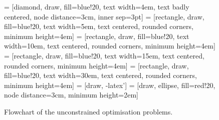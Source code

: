 \begin{figure}

 =   [diamond,   draw, fill=blue!20, text width=4em, text badly centered, node distance=3cm, inner sep=3pt]
 =      [rectangle, draw, fill=blue!20, text width=5em,   text centered,       rounded corners,   minimum height=4em]
 = [rectangle, draw, fill=blue!20, text width=10em,  text centered,       rounded corners,   minimum height=4em]
 = [rectangle, draw, fill=blue!20, text width=15em,  text centered,       rounded corners,   minimum height=4em]
 =  [rectangle, draw, fill=blue!20, text width=30em,  text centered,       rounded corners,   minimum height=4em]
 =       [draw, -latex']
 =      [draw, ellipse,   fill=red!20,  node distance=3cm,                                        minimum height=2em]
   
\begin{center} 
\end{center}
\caption{Flowchart of the unconstrained optimisation problems.}
\label{Appendix:UnconstrainedOptimisationMethods:Fig:FlowChart}
\end{figure}
